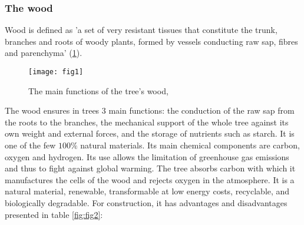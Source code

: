 \subsubsection{The wood}

Wood is defined as 'a set of very resistant tissues that constitute the trunk, branches and roots of woody plants, formed by vessels conducting raw sap, fibres and parenchyma' (\ref{fig:fig1}). 


\begin{figure}[htp]
	\centering
	\texttt{[image: fig1]}
	\caption{The main functions of the tree's wood, \cite{B.Thibaut}}
	\label{fig:fig1}
\end{figure}

The wood ensures in trees 3 main functions: the conduction of the raw sap from the roots to the branches, the mechanical support of the whole tree against its own weight and external forces, and the storage of nutrients such as starch. It is one of the few $100 \%$ natural materials. Its main chemical components are carbon, oxygen and hydrogen. Its use allows the limitation of greenhouse gas emissions and thus to fight against global warming. The tree absorbs carbon with which it manufactures the cells of the wood and rejects oxygen in the atmosphere. It is a natural material, renewable, transformable at low energy costs, recyclable, and biologically degradable. For construction, it has advantages and disadvantages presented in table \ref{fig:fig2}:

\begin{comment}
\begin{table} \centering
	\begin{tabular}{cc}
		\toprule %
		 The advantages and disadvantages of wood  \\\midrule
		The advantages & The disavantages \\\midrule
		Solidity and lightness: the strength-to-weight ratio is high. Its low density (500kg/m3) allows the use of less massive foundations.& Natural material and therefore has a high variability \\\midrule  
		Good thermal insulation: it is much less conductive than steel or concrete and reduces thermal bridges in buildings. & Orthotropic material \\\midrule
		Renewable and aesthetic. & Moisture-sensitive material \\\midrule
		Chemically inert. & Material sensitive to attack by insects and fungi \\\midrule
		Good fire behaviour: there is no toxic release, little heat transmission to neighbouring parts. Wood has a higher load-bearing capacity than steel. & Material that requires regular maintenance. \\ 
		\bottomrule %
	\end{tabular}
	\caption{Orders of magnitude of axial compressive strengths and elastic moduli}
	\label{fig:fig13}
\end{table}
\end{comment}

